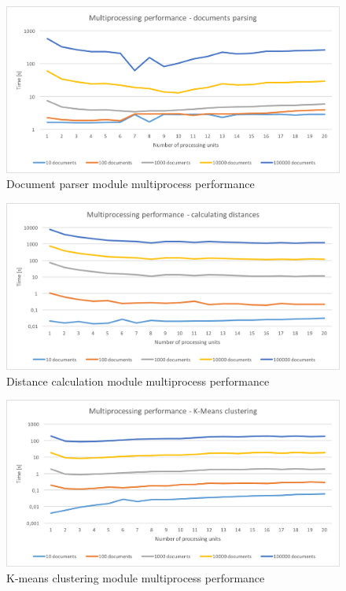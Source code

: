 \begin{figure}
\begin{center}
 \includegraphics[width=0.9\linewidth]{images/tests/mp-doc-parsing.png}
 \caption{Document parser module multiprocess performance}
 \label{mp-doc-parsing}
 \end{center}
 \end{figure}
 
 \begin{figure}
\begin{center}
 \includegraphics[width=0.9\linewidth]{images/tests/mp-distances.png}
 \caption{Distance calculation module multiprocess performance}
 \label{mp-distances}
 \end{center}
 \end{figure}
 
  \begin{figure}
\begin{center}
 \includegraphics[width=0.9\linewidth]{images/tests/mp-kmeans.png}
 \caption{K-means clustering module multiprocess performance}
 \label{mp-kmeans}
 \end{center}
 \end{figure}
 

